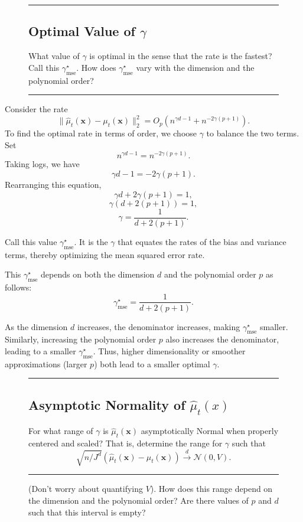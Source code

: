 \documentclass{article}
\newenvironment{colorparagraph}[1]{\par\color{#1}}{\par}
\begin{document}
\begin{figure}[H]
  \begin{colorparagraph}{questioncolor}
  \rule{\textwidth}{0.5pt}
  \label{q1d}
  \subsection{Optimal Value of \(\gamma\)}
  
  What value of \( \gamma \) is optimal in the sense that the rate is the fastest? Call this \( \gamma^\star_{\text{mse}} \). How does \( \gamma^\star_{\text{mse}} \) vary with the dimension and the polynomial order?
  
  \rule{\textwidth}{0.5pt}
  \end{colorparagraph}
\end{figure}

Consider the rate
\[
\|\hat{\mu}_t(\mathbf{x}) - \mu_t(\mathbf{x})\|_2^2 = O_p\left( n^{\gamma d - 1} + n^{-2\gamma(p+1)} \right).
\]
To find the optimal rate in terms of order, we choose \(\gamma\) to balance the two terms. Set
\[
n^{\gamma d - 1} = n^{-2\gamma(p+1)}.
\]
Taking logs, we have
\[
\gamma d - 1 = -2\gamma(p+1).
\]
Rearranging this equation,
\[
\gamma d + 2\gamma(p+1) = 1,
\]
\[
\gamma (d + 2(p+1)) = 1,
\]
\[
\gamma = \frac{1}{d + 2(p+1)}.
\]

Call this value \(\gamma^\star_{\text{mse}}\). It is the \(\gamma\) that equates the rates of the bias and variance terms, thereby optimizing the mean squared error rate.

This \(\gamma^\star_{\text{mse}}\) depends on both the dimension \( d \) and the polynomial order \( p \) as follows:
\[
\gamma^\star_{\text{mse}} = \frac{1}{d + 2(p+1)}.
\]

As the dimension \( d \) increases, the denominator increases, making \(\gamma^\star_{\text{mse}}\) smaller. Similarly, increasing the polynomial order \( p \) also increases the denominator, leading to a smaller \(\gamma^\star_{\text{mse}}\). Thus, higher dimensionality or smoother approximations (larger \( p \)) both lead to a smaller optimal \(\gamma\).
  
\begin{figure}[H]
  \begin{colorparagraph}{questioncolor}
  \rule{\textwidth}{0.5pt}
  \label{q1e}
  \subsection{Asymptotic Normality of \(\hat{\mu}_t(x)\)}
  
  For what range of \( \gamma \) is \( \hat{\mu}_t(\mathbf{x}) \) asymptotically Normal when properly centered and scaled? That is, determine the range for \( \gamma \) such that
  \[
  \sqrt{n / J^d} (\hat{\mu}_t(\mathbf{x}) - \mu_t(\mathbf{x})) \overset{d}{\to} \mathcal{N}(0, V).
  \]
  
  \rule{\textwidth}{0.5pt}

  (Don't worry about quantifying $V$). How does this range depend on the dimension and the polynomial order? Are there values of $p$ and $d$ such that this interval is empty?
  \end{colorparagraph}
\end{figure}
\end{document}

